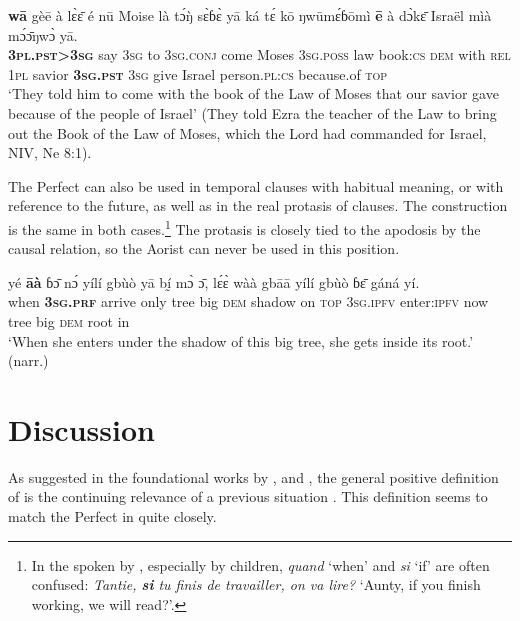 \documentclass[output=paper]{LSP/langsci}
\begin{document}
\begin{exe} \ex
\gll \textbf{wā}	gèē	à	lɛ̀ɛ̄	é	nū	Moise	là	tɔ́ŋ̀	sɛ̀ɓɛ̀ yā	ká	tɛ́	kō	ŋwūmɛ́ɓōmì	\textbf{ē}	à	dɔ̀kɛ̄	Israël	mìà mɔ́ɔ̄ŋwɔ̀	yā. \\
	\textbf{3\textsc{pl}.\textsc{pst}>3\textsc{sg}}	say	3\textsc{sg}	to	3\textsc{sg}.\textsc{conj}	come	Moses	3\textsc{sg}.\textsc{poss}	law	book:\textsc{cs} \textsc{dem}	with	\textsc{rel}	1\textsc{pl}	savior	\textbf{3\textsc{sg}.\textsc{pst}}	3\textsc{sg}	give	Israel	person.\textsc{pl}:\textsc{cs} because.of	\textsc{top} \\
\glt ‘They told him to come with the book of the Law of Moses that our savior gave because of the people of Israel’ (They told Ezra the teacher of the Law to bring out the Book of the Law of Moses, which the Lord had commanded for Israel, NIV, Ne 8:1).
\end{exe}

The Perfect can also be used in temporal clauses with habitual meaning, or with reference to the future, as well as in the real protasis of  clauses. The construction is the same in both cases.\footnote{In the  spoken by , especially by children, \textit{quand} ‘when’ and \textit{si} ‘if’ are often confused: \textit{Tantie, \textbf{si} tu finis de travailler, on va lire?}  ‘Aunty, if you finish working, we will read?’.} The protasis is closely tied to the apodosis by the causal relation, so the Aorist can never be used in this position.  

\begin{exe} \ex
\gll yé	\textbf{āà}	ɓɔ̄	nɔ́	yílí	gbùò	yā	bḭ́	mɔ̀	ɔ̄, lɛ́ɛ̀	wàà	gbāā	yílí	gbùò	ɓɛ̄	gáná	yí. \\
	when	\textbf{3\textsc{sg}.\textsc{prf}}	arrive	only	tree	big	\textsc{dem}	shadow	on	\textsc{top} 3\textsc{sg}.\textsc{ipfv}	enter:\textsc{ipfv}	now	tree	big	\textsc{dem}	root	in\\
\glt ‘When she enters under the shadow of this big tree, she gets inside its root.’ (narr.)
\end{exe}

\section{Discussion}
\label{khachs6}

As suggested in the foundational works by \citet{khachcomrie1976}, \citet{khachmccoard1978} and \citet{khachdahl1985}, the general positive definition of  is the continuing relevance of a previous situation \citep[56]{khachcomrie1976}. This definition seems to match the Perfect in  quite closely.
\end{document}
